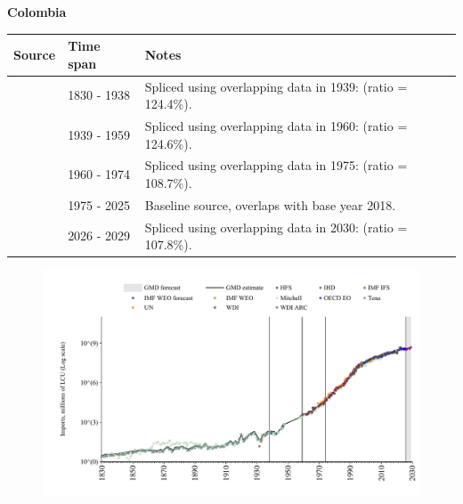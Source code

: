 \documentclass[12pt,a4paper,landscape]{article}
\begin{document}
\begin{adjustbox}{max totalsize={\paperwidth}{\paperheight},center}
\begin{minipage}[t][\textheight][t]{\textwidth}
\vspace*{0.5cm}
{}
\begin{center}
{\Large\bfseries Colombia}
\end{center}
\vspace{0.5cm}
\begin{table}[H]
\centering
\small
\begin{tabular}{|l|l|l|}
\hline
\textbf{Source} & \textbf{Time span} & \textbf{Notes} \\
\hline
\rowcolor{white}\cite{Tena}& 1830 - 1938 &Spliced using overlapping data in 1939: (ratio = 124.4\%).\\
\rowcolor{lightgray}\cite{Mitchell}& 1939 - 1959 &Spliced using overlapping data in 1960: (ratio = 124.6\%).\\
\rowcolor{white}\cite{WDI}& 1960 - 1974 &Spliced using overlapping data in 1975: (ratio = 108.7\%).\\
\rowcolor{lightgray}\cite{OECD_EO}& 1975 - 2025 &Baseline source, overlaps with base year 2018.\\
\rowcolor{white}\cite{IMF_WEO_forecast}& 2026 - 2029 &Spliced using overlapping data in 2030: (ratio = 107.8\%).\\
\hline
\end{tabular}
\end{table}
\begin{figure}[H]
\centering
\includegraphics[width=\textwidth,height=0.6\textheight,keepaspectratio]{graphs/COL_imports.pdf}
\end{figure}
\end{minipage}
\end{adjustbox}
\end{document}
